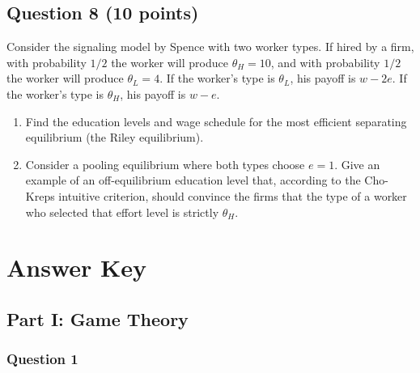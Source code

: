 \documentclass[12pt,a4paper]{article}
\begin{document}
\medskip
\noindent\framebox[\linewidth]{\rule{0pt}{2.5em}}

\subsection*{Question 8 (10 points)}

Consider the signaling model by Spence with two worker types. If hired by a firm, with probability \(1/2\) the worker will produce \(\theta_H = 10\), and with probability \(1/2\) the worker will produce \(\theta_L = 4\). If the worker's type is \(\theta_L\), his payoff is \(w - 2e\). If the worker's type is \(\theta_H\), his payoff is \(w - e\).

\begin{enumerate}
  \item Find the education levels and wage schedule for the most efficient separating equilibrium (the Riley equilibrium).
  \item Consider a pooling equilibrium where both types choose \(e=1\). Give an example of an off-equilibrium education level that, according to the Cho-Kreps intuitive criterion, should convince the firms that the type of a worker who selected that effort level is strictly \(\theta_H\).
\end{enumerate}

\medskip
\noindent\framebox[\linewidth]{\rule{0pt}{2.5em}}

\newpage


\section*{Answer Key}

\subsection*{Part I: Game Theory}

\subsubsection*{Question 1}
\end{document}
